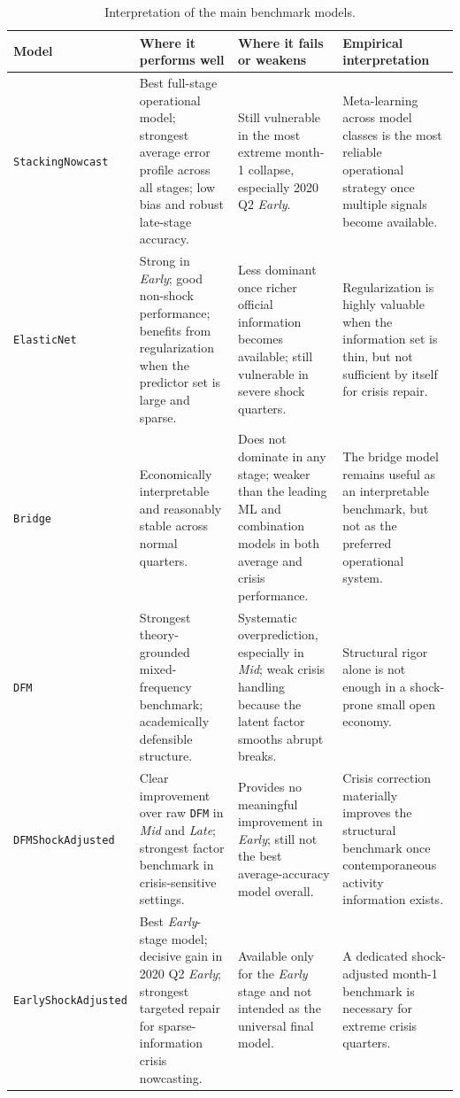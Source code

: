 \documentclass[12pt,a4paper]{article}
\begin{document}
\begin{table}[H]
    \centering
    \footnotesize
    \caption{Interpretation of the main benchmark models.}
    \label{tab:model_interpretation_detail}
    \begin{tabularx}{\textwidth}{>{\raggedright\arraybackslash}p{3.9cm}YYY}
        \toprule
        Model & Where it performs well & Where it fails or weakens & Empirical interpretation \\
        \midrule
        \texttt{StackingNowcast} & Best full-stage operational model; strongest average error profile across all stages; low bias and robust late-stage accuracy. & Still vulnerable in the most extreme month-1 collapse, especially 2020 Q2 \textit{Early}. & Meta-learning across model classes is the most reliable operational strategy once multiple signals become available. \\
        \texttt{ElasticNet} & Strong in \textit{Early}; good non-shock performance; benefits from regularization when the predictor set is large and sparse. & Less dominant once richer official information becomes available; still vulnerable in severe shock quarters. & Regularization is highly valuable when the information set is thin, but not sufficient by itself for crisis repair. \\
        \texttt{Bridge} & Economically interpretable and reasonably stable across normal quarters. & Does not dominate in any stage; weaker than the leading ML and combination models in both average and crisis performance. & The bridge model remains useful as an interpretable benchmark, but not as the preferred operational system. \\
        \texttt{DFM} & Strongest theory-grounded mixed-frequency benchmark; academically defensible structure. & Systematic overprediction, especially in \textit{Mid}; weak crisis handling because the latent factor smooths abrupt breaks. & Structural rigor alone is not enough in a shock-prone small open economy. \\
        \texttt{DFMShockAdjusted} & Clear improvement over raw \texttt{DFM} in \textit{Mid} and \textit{Late}; strongest factor benchmark in crisis-sensitive settings. & Provides no meaningful improvement in \textit{Early}; still not the best average-accuracy model overall. & Crisis correction materially improves the structural benchmark once contemporaneous activity information exists. \\
        \texttt{EarlyShockAdjusted} & Best \textit{Early}-stage model; decisive gain in 2020 Q2 \textit{Early}; strongest targeted repair for sparse-information crisis nowcasting. & Available only for the \textit{Early} stage and not intended as the universal final model. & A dedicated shock-adjusted month-1 benchmark is necessary for extreme crisis quarters. \\

\end{tabularx}
\end{table}
\end{document}
